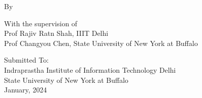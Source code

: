   \begin{center}
    \Large{By}
  \end{center}
  
  \author{Yaman K Singla}
  \vspace{2cm}

  \begin{center}
    \Large{With the supervision of} \\
    \vspace{0.5cm}
    \Large{Prof Rajiv Ratn Shah, IIIT Delhi} \\
    \Large{Prof Changyou Chen, State University of New York at Buffalo} \\

  \end{center}
  
  \vfill
  \begin{center}
  \Large{Submitted To:}\\
    \Large{Indraprastha Institute of Information Technology Delhi} \\
    \Large{State University of New York at Buffalo} \\
    \vspace{0.5cm}
    \Large{January, 2024}
  \end{center}


\newpage
 



 

 
  
  



